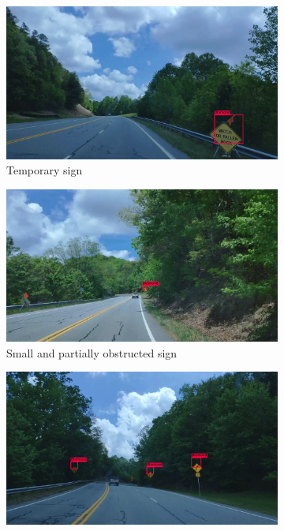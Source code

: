 \begin{figure}
  \begin{center}
    \begin{subfigure}[t]{.49\linewidth}
      \centering
      \includegraphics[width=0.99\linewidth]{figures/examples/sr2/TP/TP_01.png}
      \caption{Temporary sign}
      \label{fig:temporaryTP}
    \end{subfigure}
    \begin{subfigure}[t]{.49\linewidth}
      \centering
      \includegraphics[width=0.99\linewidth]{figures/examples/sr2/TP/TP_09.png}
      \caption{Small and partially obstructed sign}
      \label{fig:farobstTP}
    \end{subfigure}
    \begin{subfigure}[t]{.49\linewidth}
      \centering
      \includegraphics[width=0.99\linewidth]{figures/examples/sr2/TP/TP_05.png}

\end{subfigure}
\end{center}
\end{figure}

